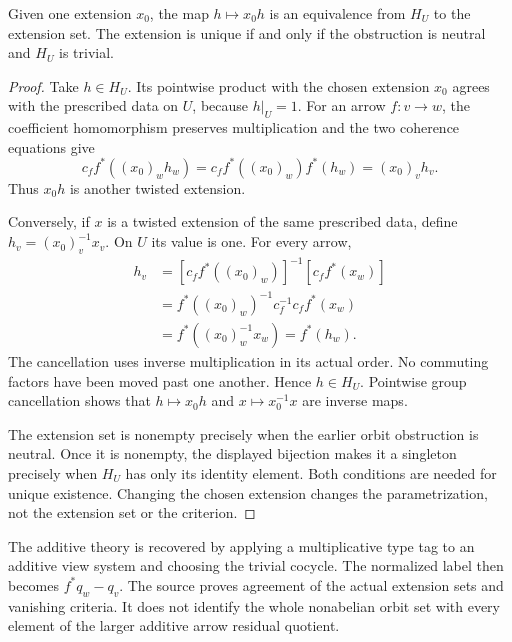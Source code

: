 \begin{theorem}\label{KS32}
Given one extension \(x_0\), the map \(h\mapsto x_0h\) is an equivalence from \(H_U\) to the extension set. The extension is unique if and only if the obstruction is neutral and \(H_U\) is trivial.
\end{theorem}
\begin{proof}
Take \(h\in H_U\). Its pointwise product with the chosen extension \(x_0\) agrees with the prescribed data on \(U\), because \(h|_U=1\). For an arrow \(f:v\to w\), the coefficient homomorphism preserves multiplication and the two coherence equations give
\[
 c_f f^*((x_0)_wh_w)
 =c_f f^*((x_0)_w)f^*(h_w)
 =(x_0)_vh_v.
\]
Thus \(x_0h\) is another twisted extension.

Conversely, if \(x\) is a twisted extension of the same prescribed data, define \(h_v=(x_0)_v^{-1}x_v\). On \(U\) its value is one. For every arrow,
\[
 \begin{aligned}
 h_v
 &=[c_f f^*((x_0)_w)]^{-1}[c_f f^*(x_w)]\\
 &=f^*((x_0)_w)^{-1}c_f^{-1}c_f f^*(x_w)\\
 &=f^*((x_0)_w^{-1}x_w)=f^*(h_w).
 \end{aligned}
\]
The cancellation uses inverse multiplication in its actual order. No commuting factors have been moved past one another. Hence \(h\in H_U\). Pointwise group cancellation shows that \(h\mapsto x_0h\) and \(x\mapsto x_0^{-1}x\) are inverse maps.

The extension set is nonempty precisely when the earlier orbit obstruction is neutral. Once it is nonempty, the displayed bijection makes it a singleton precisely when \(H_U\) has only its identity element. Both conditions are needed for unique existence. Changing the chosen extension changes the parametrization, not the extension set or the criterion.
\end{proof}
The additive theory is recovered by applying a multiplicative type tag to an additive view system and choosing the trivial cocycle. The normalized label then becomes \(f^*q_w-q_v\). The source proves agreement of the actual extension sets and vanishing criteria. It does not identify the whole nonabelian orbit set with every element of the larger additive arrow residual quotient.

